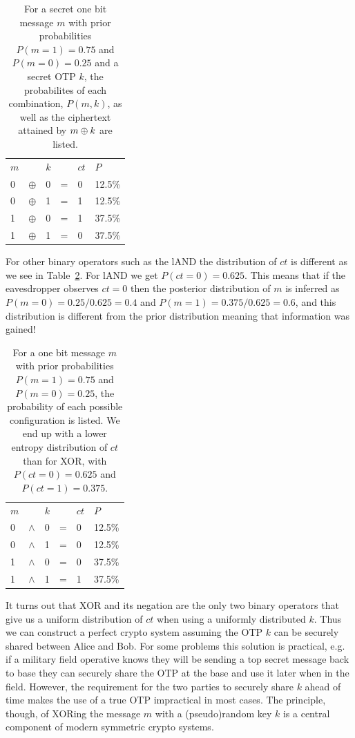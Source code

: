\begin{table}[H]
\centering
\begin{tabular}{llllll}
$m$ & & $k$ & & $ct$ & $P$    \\
0 &  $\oplus$  & 0 & = & 0    & 12.5\% \\
0 & $\oplus$  & 1 & = & 1    & 12.5\% \\
1 & $\oplus$  & 0 & = & 1    & 37.5\% \\
1 &  $\oplus$  & 1 &= & 0    & 37.5\%
\end{tabular}
  \captionsetup{width=.8\linewidth}
\caption[Probabilities after XOR with Random Key]{\label{otp-xor-probs-example}For a secret one bit message $m$ with prior probabilities $P(m=1)=0.75$ and $P(m=0)=0.25$ and a secret \ac{OTP} $k$, the probabilites of each combination, $P(m,k)$, as well as the ciphertext attained by $m\oplus k$ are listed.}
\end{table}

For other binary operators such as the \ac{lAND} the distribution of $ct$ is different as we see in Table~\ref{otp-and-probs-example}. For \ac{lAND} we get $P(ct=0)=0.625$. This means that if the eavesdropper observes $ct=0$ then the posterior distribution of $m$ is inferred as $P(m=0)=0.25/0.625=0.4$ and $P(m=1)=0.375/0.625=0.6$, and this distribution is different from the prior distribution meaning that information was gained!

\begin{table}[H]
\centering
\begin{tabular}{llllll}
$m$ & & $k$ & & $ct$ & $P$    \\
0 &  $\land$  & 0 & = & 0    & 12.5\% \\
0 & $\land$  & 1 & = & 0    & 12.5\% \\
1 & $\land$  & 0 & = & 0    & 37.5\% \\
1 &  $\land$  & 1 &= & 1    & 37.5\%
\end{tabular}
  \captionsetup{width=.8\linewidth}
\caption[Probabilities after AND with Random Key]{\label{otp-and-probs-example}For a one bit message $m$ with prior probabilities $P(m=1)=0.75$ and $P(m=0)=0.25$, the probability of each possible configuration is listed. We end up with a lower entropy distribution of $ct$ than for \ac{XOR}, with $P(ct=0)=0.625$ and $P(ct=1)=0.375$.}
\end{table}

It turns out that \ac{XOR} and its negation are the only two binary operators that give us a uniform distribution of $ct$ when using a uniformly distributed $k$. Thus we can construct a perfect crypto system assuming the \ac{OTP} $k$ can be securely shared between Alice and Bob. For some problems this solution is practical, e.g. if a military field operative knows they will be sending a top secret message back to base they can securely share the \ac{OTP} at the base and use it later when in the field. However, the requirement for the two parties to securely share $k$ ahead of time makes the use of a true \ac{OTP} impractical in most cases. The principle, though, of \ac{XOR}ing the message $m$ with a (pseudo)random key $k$ is a central component of modern symmetric crypto systems.

